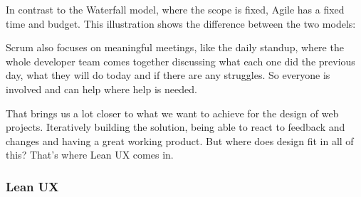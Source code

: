 In contrast to the Waterfall model, where the scope is fixed, Agile has a fixed time and budget.
This illustration shows the difference between the two models:

Scrum also focuses on meaningful meetings, like the daily standup, where the whole developer team
comes together discussing what each one did the previous day, what they will do today and if there
are any struggles. So everyone is involved and can help where help is needed.


That brings us a lot closer to what we want to achieve for the design of web projects. Iteratively
building the solution, being able to react to feedback and changes and having a great working
product. But where does design fit in all of this? That's where Lean UX comes in.

\subsubsection{Lean UX}

